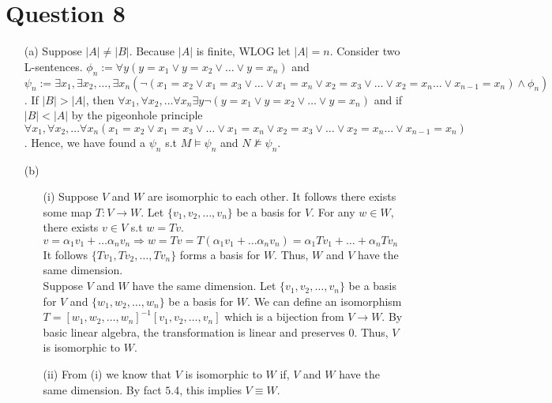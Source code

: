 \documentclass[10pt]{article}
\begin{document}
\section*{Question 8}
\begin{itemize}
    \item [(a)] Suppose $|A|\neq|B|$. Because $|A|$ is finite, WLOG let $|A|=n$.
    Consider two L-sentences. 
    $\phi_n:=\forall y(y=x_1\lor y=x_2\lor\ldots \lor y=x_n)$ and $\psi_n:=\exists x_1,\exists x_2,\ldots,\exists x_n(\lnot(x_1=x_2\lor x_1=x_3\lor\ldots\lor x_1=x_n\lor x_2=x_3\lor\ldots\lor x_2=x_n\ldots \lor x_{n-1}=x_n)\land \phi_n)$. 
    If $|B|>|A|$, then $\forall x_1,\forall x_2,\ldots\forall x_n\exists y\lnot(y=x_1\lor y=x_2\lor\ldots \lor y=x_n)$ and if $|B|<|A|$ by the pigeonhole principle $\forall x_1,\forall x_2,\ldots\forall x_n(x_1=x_2\lor x_1=x_3\lor\ldots\lor x_1=x_n\lor x_2=x_3\lor\ldots\lor x_2=x_n\ldots \lor x_{n-1}=x_n)$. Hence, we have found a $\psi_n$ s.t $M\models\psi_n$ and $N\not\models\psi_n$.
    \item [(b)] \begin{itemize}
        \item [(i)] Suppose $V$ and $W$ are isomorphic to each other. 
        It follows there exists some map $T:V\rightarrow W$. 
        Let $\{v_1,v_2,\ldots,v_n\}$ be a basis for $V$. 
        For any $w\in W$, there exists $v\in V$ s.t $w=Tv$.
        $v=\alpha_1v_1+\ldots\alpha_n v_n\Rightarrow w=Tv=T(\alpha_1v_1+\ldots\alpha_n v_n)=\alpha_1Tv_1+\ldots+\alpha_n Tv_n$
        It follows $\{Tv_1,Tv_2,\ldots,Tv_n\}$ forms a basis for $W$.
        Thus, $W$ and $V$ have the same dimension.\\ 
        Suppose $V$ and $W$ have the same dimension.
        Let $\{v_1,v_2,\ldots,v_n\}$ be a basis for $V$ and $\{w_1,w_2,\ldots,w_n\}$ be a basis for $W$.
        We can define an isomorphism $T={[w_1,w_2,\ldots, w_n]}^{-1}[v_1,v_2,\ldots, v_n]$ which is a bijection from $V\rightarrow W$.
        By basic linear algebra, the transformation is linear and preserves $0$. Thus, $V$ is isomorphic to $W$.
        \item[(ii)] From (i) we know that $V$ is isomorphic to $W$ if, $V$ and $W$ have the same dimension. 
        By fact $5.4$, this implies $V\equiv W$.
    \end{itemize}
\end{itemize}
\end{document}
